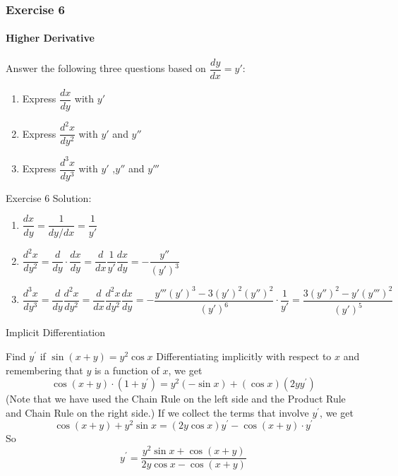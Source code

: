\begin{frame}
    \frametitle{Exercise 6}
    \framesubtitle{Higher Derivative}
    Answer the following three questions based on $\dfrac{dy}{dx} = y'$:
    \begin{enumerate}
        \item Express $\dfrac{dx}{dy}$ with $y'$
        \item Express $\dfrac{d^{2}x}{dy^{2}}$ with $y'$ and $y''$
        \item Express $\dfrac{d^{3}x}{dy^{3}}$ with $y'$ ,$y''$ and $y'''$
    \end{enumerate}
\end{frame}



\begin{frame}{Exercise 6}
    Solution:
    \begin{enumerate}
        \item $\dfrac{dx}{dy} = \dfrac{1}{dy/dx} = \dfrac{1}{y'}$
        \item $\dfrac{d^2x}{dy^2} = \dfrac{d}{dy}\cdot \dfrac{dx}{dy} = \dfrac{d}{dx}\dfrac{1}{y'}\dfrac{dx}{dy} = -\dfrac{y''}{(y')^3}$
        \item $\dfrac{d^3x}{dy^3} = \dfrac{d}{dy}\dfrac{d^2x}{dy^2} = \dfrac{d}{dx}\dfrac{d^2x}{dy^2}\dfrac{dx}{dy} = - \dfrac{y'''(y')^3 - 3(y')^2(y'')^2}{(y')^6}\cdot \dfrac{1}{y'} = \dfrac{3(y'')^2 - y' (y''')^2}{(y')^5}$
    \end{enumerate}

\end{frame}



\begin{frame}{Implicit Differentiation}
    \begin{block}{Find $y^{\prime}$ if $\sin (x+y)=y^{2} \cos x$}
        Differentiating implicitly with respect to $x$ and remembering that $y$ is a function of $x$, we get
        $$
            \cos (x+y) \cdot\left(1+y^{\prime}\right)=y^{2}(-\sin x)+(\cos x)\left(2 y y^{\prime}\right)
        $$
        (Note that we have used the Chain Rule on the left side and the Product Rule and Chain Rule on the right side.) If we collect the terms that involve $y^{\prime}$, we get
        $$
            \cos (x+y)+y^{2} \sin x=(2 y \cos x) y^{\prime}-\cos (x+y) \cdot y^{\prime}
        $$
        So
        $$
            y^{\prime}=\frac{y^{2} \sin x+\cos (x+y)}{2 y \cos x-\cos (x+y)}
        $$
    \end{block}
\end{frame}



